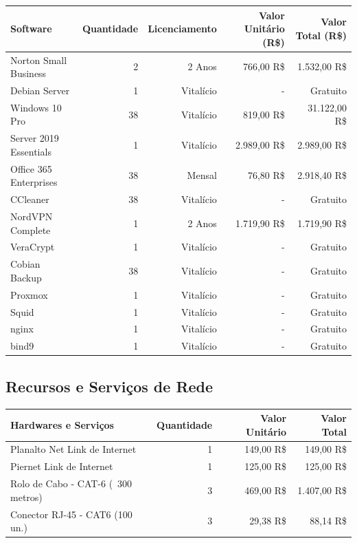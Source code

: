 \documentclass[12pt]{article}
\begin{document}
\begin{center}
\begin{tabular}{| l | r | r | r | r |}
\hline 
Software & Quantidade & Licenciamento & Valor Unitário (R\$) & Valor Total (R\$)\\
\hline
Norton Small Business & 2 & 2 Anos & 766,00 R\$ & 1.532,00 R\$\\
Debian Server & 1 & Vitalício & - & Gratuito\\
Windows 10 Pro & 38 & Vitalício & 819,00 R\$ & 31.122,00 R\$\\
Server 2019 Essentials & 1 & Vitalício & 2.989,00 R\$ & 2.989,00 R\$\\
Office 365 Enterprises & 38 & Mensal & 76,80 R\$ & 2.918,40 R\$\\
CCleaner & 38 & Vitalício & - & Gratuito\\
NordVPN Complete & 1 & 2 Anos & 1.719,90 R\$ & 1.719,90 R\$\\
VeraCrypt & 1 & Vitalício & - & Gratuito\\
Cobian Backup & 38 & Vitalício & - & Gratuito\\
Proxmox & 1 & Vitalício & - & Gratuito\\
Squid & 1 & Vitalício  & - & Gratuito\\
nginx & 1 & Vitalício & - & Gratuito\\
bind9 & 1 & Vitalício & - & Gratuito\\
\hline
\end{tabular}
\end{center}
\subsection{Recursos e Serviços de Rede}
\begin{center}
\begin{tabular}{| l | r | r | r |}
\hline
Hardwares e Serviços & Quantidade & Valor Unitário & Valor Total\\
\hline
Planalto Net Link de Internet & 1 & 149,00 R\$ & 149,00 R\$\\
Piernet Link de Internet & 1 & 125,00 R\$ & 125,00 R\$\\
Rolo de Cabo - CAT-6 (~300 metros) & 3 & 469,00 R\$ & 1.407,00 R\$\\
Conector RJ-45 - CAT6 (100 un.) & 3 & 29,38 R\$ & 88,14 R\$\\
\hline
\end{tabular}
\end{center}
\end{document}
